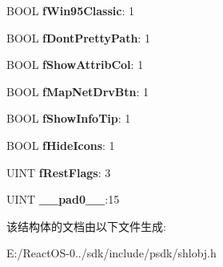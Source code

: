\begin{DoxyCompactItemize}
B\+O\+OL {\bfseries f\+Win95\+Classic}\+: 1
\item 
\mbox{\label{struct_s_h_e_l_l_f_l_a_g_s_t_a_t_e_aea1bf136ab2fd0273254bc0aa0f87f8d}} 
B\+O\+OL {\bfseries f\+Dont\+Pretty\+Path}\+: 1
\item 
\mbox{\label{struct_s_h_e_l_l_f_l_a_g_s_t_a_t_e_aee3b4fddb4bc639f7bc432c52b9a12b8}} 
B\+O\+OL {\bfseries f\+Show\+Attrib\+Col}\+: 1
\item 
\mbox{\label{struct_s_h_e_l_l_f_l_a_g_s_t_a_t_e_a3cdc09232b1a96d55185e32217d7b8e0}} 
B\+O\+OL {\bfseries f\+Map\+Net\+Drv\+Btn}\+: 1
\item 
\mbox{\label{struct_s_h_e_l_l_f_l_a_g_s_t_a_t_e_a6e6a7975ead5e15e1b50b22d2a6c5a1d}} 
B\+O\+OL {\bfseries f\+Show\+Info\+Tip}\+: 1
\item 
\mbox{\label{struct_s_h_e_l_l_f_l_a_g_s_t_a_t_e_a84535420a0a541d71a1dab168f619767}} 
B\+O\+OL {\bfseries f\+Hide\+Icons}\+: 1
\item 
\mbox{\label{struct_s_h_e_l_l_f_l_a_g_s_t_a_t_e_aa6ac1d20303230f825f52878b0fc44ab}} 
U\+I\+NT {\bfseries f\+Rest\+Flags}\+: 3
\item 
\mbox{\label{struct_s_h_e_l_l_f_l_a_g_s_t_a_t_e_a6a748f872880b94937bd0b6d2f37fd1c}} 
U\+I\+NT {\bfseries \+\_\+\+\_\+pad0\+\_\+\+\_\+}\+:15
\end{DoxyCompactItemize}


该结构体的文档由以下文件生成\+:\begin{DoxyCompactItemize}
\item 
E\+:/\+React\+O\+S-\/0../sdk/include/psdk/shlobj.\+h\end{DoxyCompactItemize}
